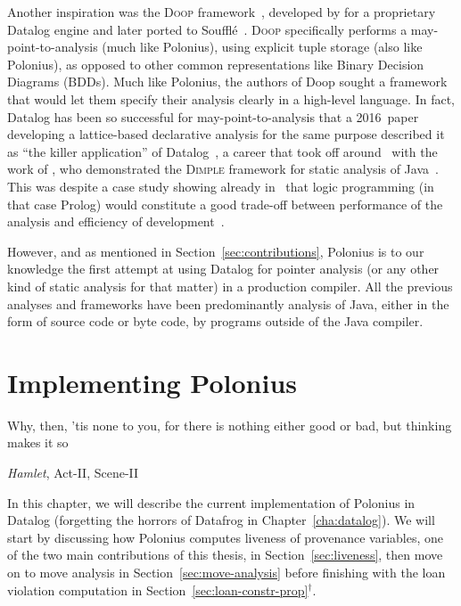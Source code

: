 \documentclass[11pt,a4paper,twoside,openany,draft]{report}
\newcommand{\notmine}[0] {$^\dagger$}
\begin{document}
Another inspiration was the \textsc{Doop}
framework~\cite{smaragdakis_using_2010}, developed by
\citeauthor*{smaragdakis_using_2010} for a proprietary Datalog engine and later
ported to Souffl{\'e}~\cite{doop-porting}. \textsc{Doop} specifically performs a
may-point-to-analysis (much like Polonius), using explicit tuple storage (also
like Polonius), as opposed to other common representations like Binary Decision
Diagrams (BDDs). Much like Polonius, the authors of Doop sought a framework that
would let them specify their analysis clearly in a high-level language. In fact,
Datalog has been so successful for may-point-to-analysis that a 2016~paper
developing a lattice-based declarative analysis for the same purpose described
it as ``the killer application'' of
Datalog~\cite{Madsen:2016:DFD:2980983.2908096}, a career that took off
around~\citeyear{Benton:2007:ISD:1273920.1273923} with the work of
\citeauthor{Benton:2007:ISD:1273920.1273923}, who demonstrated the
\textsc{Dimple} framework for static analysis of
Java~\cite{Benton:2007:ISD:1273920.1273923}. This was despite a case study
showing already in~\citeyear{Dawson:1996:PPA:231379.231399} that logic
programming (in that case Prolog) would constitute a good trade-off between
performance of the analysis and efficiency of
development~\cite{Dawson:1996:PPA:231379.231399}.

However, and as mentioned in Section~\ref{sec:contributions}, Polonius is to our
knowledge the first attempt at using Datalog for pointer analysis (or any other
kind of static analysis for that matter) in a production compiler. All the
previous analyses and frameworks have been predominantly analysis of Java,
either in the form of source code or byte code, by programs outside of the Java
compiler.


\chapter{Implementing Polonius}\label{cha:implementation}

\epigraph{Why, then, 'tis none to you, for there is nothing either good or bad,
  but thinking makes it so}%
{\textit{Hamlet}, Act-II, Scene-II}

In this chapter, we will describe the current implementation of Polonius in
Datalog (forgetting the horrors of Datafrog in Chapter~\ref{cha:datalog}). We
will start by discussing how Polonius computes liveness of provenance variables,
one of the two main contributions of this thesis, in Section~\ref{sec:liveness},
then move on to move analysis in Section~\ref{sec:move-analysis} before
finishing with the loan violation computation in
Section~\ref{sec:loan-constr-prop}\notmine{}.
\end{document}
